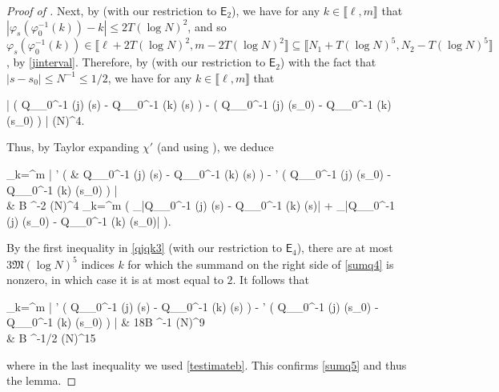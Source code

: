 \documentclass{amsart}
\numberwithin{equation}{section}
\theoremstyle{remark}
\theoremstyle{definition}
\begin{document}
\begin{proof}[Proof of ]
		Next, by  (with our restriction to $\mathsf{E}_2$), we have for any $k \in \llbracket \ell, m \rrbracket$ that $|\varphi_s (\varphi_0^{-1} (k)) - k| \le 2T (\log N)^2$, and so $\varphi_s (\varphi_0^{-1} (k)) \in \llbracket \ell + 2T(\log N)^2, m - 2T (\log N)^2 \rrbracket \subseteq \llbracket N_1 + T(\log N)^5, N_2 - T(\log N)^5 \rrbracket$, by \eqref{jinterval}. Therefore, by  (with our restriction to $\mathsf{E}_2$) with the fact that $|s-s_0| \le N^{-1} \le 1/2$, we have for any $k \in \llbracket \ell, m \rrbracket$ that
		\begin{flalign*}
			\big| \big( Q_{\varphi_0^{-1} (j)} (s) - Q_{\varphi_0^{-1} (k)} (s) \big) - \big( Q_{\varphi_0^{-1} (j)} (s_0) - Q_{\varphi_0^{-1} (k)} (s_0) \big) \big|  (\log N)^4.
		\end{flalign*}
		
		\noindent Thus, by Taylor expanding $\chi'$ (and using ), we deduce
		\begin{flalign}
			\label{sumq4} 
			\begin{aligned} 
				\displaystyle\sum_{k=\ell}^m \big| \chi' \big( & Q_{\varphi_0^{-1} (j)} (s) - Q_{\varphi_0^{-1} (k)} (s) \big) - \chi' \big(  Q_{\varphi_0^{-1} (j)} (s_0) - Q_{\varphi_0^{-1} (k)} (s_0) \big) \big| \\ 
				&  B ^{-2} (\log N)^4 \displaystyle\sum_{k=\ell}^m \big( _{|Q_{\varphi_0^{-1} (j)} (s) - Q_{\varphi_0^{-1} (k)} (s)| \le {}} + _{|Q_{\varphi_0^{-1} (j)} (s_0) - Q_{\varphi_0^{-1} (k)} (s_0)| \le \mathfrak{M}} \big). 
			\end{aligned} 
		\end{flalign}
		
		\noindent By the first inequality in \eqref{qjqk3} (with our restriction to $\mathsf{E}_4$), there are at most $3\mathfrak{M} (\log N)^5$ indices $k$ for which the summand on the right side of \eqref{sumq4} is nonzero, in which case it is at most equal to $2$. It follows that 
		\begin{flalign*} 
			\displaystyle\sum_{k=\ell}^m \big| \chi' \big( Q_{\varphi_0^{-1} (j)} (s) - Q_{\varphi_0^{-1} (k)} (s) \big) - \chi' \big(  Q_{\varphi_0^{-1} (j)} (s_0) - Q_{\varphi_0^{-1} (k)} (s_0) \big) \big| & \le 18B ^{-1} (\log N)^9 \\
			& \le B ^{-1/2} (\log N)^{15}
		\end{flalign*}
		
		\noindent where in the last inequality we used \eqref{testimateb}. This confirms \eqref{sumq5} and thus the lemma.	
	\end{proof} 
	
\end{document}

